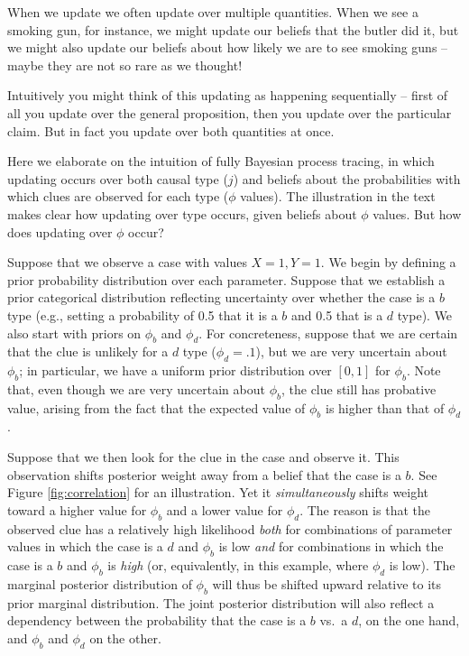 \documentclass[12pt,]{book}
\begin{document}
When we update we often update over multiple quantities. When we see a smoking gun, for instance, we might update our beliefs that the butler did it, but we might also update our beliefs about how likely we are to see smoking guns -- maybe they are not so rare as we thought!

Intuitively you might think of this updating as happening sequentially -- first of all you update over the general proposition, then you update over the particular claim. But in fact you update over both quantities at once.

Here we elaborate on the intuition of fully Bayesian process tracing, in which updating occurs over both causal type (\(j\)) and beliefs about the probabilities with which clues are observed for each type (\(\phi\) values). The illustration in the text makes clear how updating over type occurs, given beliefs about \(\phi\) values. But how does updating over \(\phi\) occur?

Suppose that we observe a case with values \(X=1, Y=1\). We begin by defining a prior probability distribution over each parameter. Suppose that we establish a prior categorical distribution reflecting uncertainty over whether the case is a \(b\) type (e.g., setting a probability of 0.5 that it is a \(b\) and 0.5 that is a \(d\) type). We also start with priors on \(\phi_b\) and \(\phi_d\). For concreteness, suppose that we are certain that the clue is unlikely for a \(d\) type (\(\phi_d=.1\)), but we are very uncertain about \(\phi_b\); in particular, we have a uniform prior distribution over \([0,1]\) for \(\phi_b\). Note that, even though we are very uncertain about \(\phi_b\), the clue still has probative value, arising from the fact that the expected value of \(\phi_b\) is higher than that of \(\phi_d\).

Suppose that we then look for the clue in the case and observe it. This observation shifts posterior weight away from a belief that the case is a \(b\). See Figure \ref{fig:correlation} for an illustration. Yet it \emph{simultaneously} shifts weight toward a higher value for \(\phi_b\) and a lower value for \(\phi_d\). The reason is that the observed clue has a relatively high likelihood \emph{both} for combinations of parameter values in which the case is a \(d\) and \(\phi_b\) is low \emph{and} for combinations in which the case is a \(b\) and \(\phi_b\) is \emph{high} (or, equivalently, in this example, where \(\phi_d\) is low). The marginal posterior distribution of \(\phi_b\) will thus be shifted upward relative to its prior marginal distribution. The joint posterior distribution will also reflect a dependency between the probability that the case is a \(b\) vs.~a \(d\), on the one hand, and \(\phi_b\) and \(\phi_d\) on the other.
\end{document}
